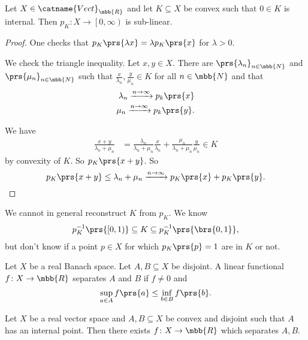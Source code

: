 \documentclass[10pt, twoside]{book}
\begin{document}
\begin{fact}
Let $X \in \catname{Vect}_{\mbb{R}}$ and let $K \subseteq X$ be convex such that $0 \in K$ is internal. Then $p_K \colon X \to \left[0, \infty \right)$ is sub-linear.
\end{fact}

\begin{proof}
One checks that $p_K\prs{\lambda x} = \lambda p_K\prs{x}$ for $\lambda > 0$.

We check the triangle inequality.
Let $x,y \in X$. There are $\prs{\lambda_n}_{n \in \mbb{N}}$ and $\prs{\mu_n}_{n \in \mbb{N}}$ such that $\frac{x}{\lambda_n}, \frac{y}{\mu_n} \in K$ for all $n \in \mbb{N}$ and that
\begin{align*}
\lambda_n \xrightarrow{n\to\infty} p_k\prs{x} \\
\mu_n \xrightarrow{n\to\infty} p_k\prs{y} \text{.}
\end{align*}

We have
\begin{align*}
\frac{x+y}{\lambda_n + \mu_n} &=
\frac{\lambda_n}{\lambda_n + \mu_n} \frac{x}{\lambda_n} + \frac{\mu_n}{\lambda_n + \mu_n} \frac{y}{\mu_n} \in K
\end{align*}
by convexity of $K$. So $p_K\prs{x+y}$.
So \[p_K\prs{x+y} \leq \lambda_n + \mu_n \xrightarrow{n\to\infty} p_K\prs{x} + p_K\prs{y}\text{.}\]
\end{proof}

\begin{remark}
We cannot in general reconstruct $K$ from $p_K$. We know
\begin{align*}
p_K^{-1}\prs{\left[0,1\right)} \subseteq K \subseteq p_K^{-1}\prs{\brs{0,1}} \text{,}
\end{align*}
but don't know if a point $p \in X$ for which $p_K\prs{p} = 1$ are in $K$ or not.
\end{remark}

\begin{definition}
Let $X$ be a real Banach space.
Let $A,B \subseteq X$ be disjoint. A linear functional $f \colon X \to \mbb{R}$ separates $A$ and $B$ if $f \neq 0$ and
\[\sup_{a \in A} f\prs{a} \leq \inf_{b \in B} f\prs{b} \text{.}\]
\end{definition}

\begin{theorem}
Let $X$ be a real vector space and $A,B \subseteq X$ be convex and disjoint such that $A$ has an internal point. Then there exists $f \colon X \to \mbb{R}$ which separates $A,B$.
\end{theorem}
\end{document}
